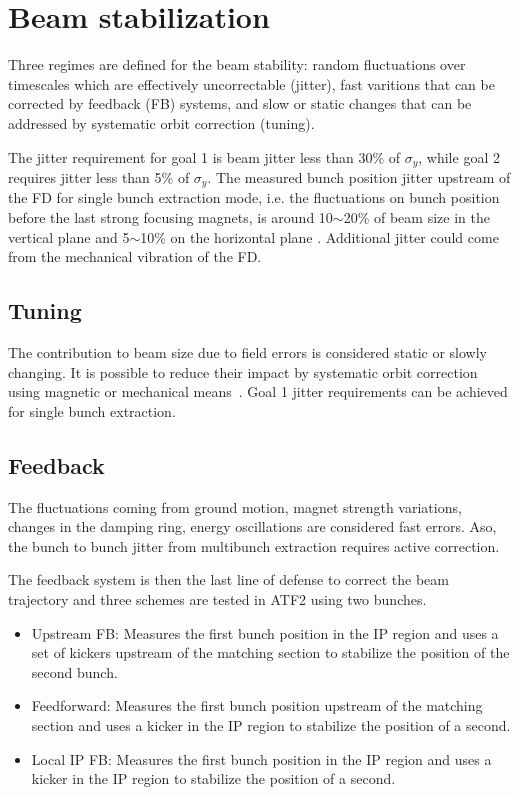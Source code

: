 \section{Beam stabilization}
Three regimes are defined for the beam stability: random fluctuations over timescales which are effectively uncorrectable (jitter), fast varitions that can be corrected by feedback (FB) systems, and slow or static changes that can be addressed by systematic orbit correction (tuning).\par
The jitter requirement for goal 1 is beam jitter less than 30\% of $\sigma_y$, while goal 2 requires jitter less than 5\% of $\sigma_y$. The measured bunch position jitter upstream of the FD for single bunch extraction mode, i.e. the fluctuations on bunch position before the last strong focusing magnets, is around 10$\sim$20\% of beam size in the vertical plane and 5$\sim$10\% on the horizontal plane \cite{PateckiJitter}. Additional jitter could come from the mechanical vibration of the FD.\par
\subsection{Tuning}
The contribution to beam size due to field errors is considered static or slowly changing. It is possible to reduce their impact by systematic orbit correction using magnetic or mechanical means~\cite{ATF2prop}. Goal 1 jitter requirements can be achieved for single bunch extraction.\par
\subsection{Feedback}
The fluctuations coming from ground motion, magnet strength variations, changes in the damping ring, energy oscillations are considered fast errors. Aso, the bunch to bunch jitter from multibunch extraction requires active correction.\par 
The feedback system is then the last line of defense to correct the beam trajectory and three schemes are tested in ATF2 using two bunches.\par
\begin{itemize}
 \item Upstream FB: Measures the first bunch position in the IP region and uses a set of kickers upstream of the matching section to stabilize the position of the second bunch.
 \item Feedforward: Measures the first bunch position upstream of the matching section and uses a kicker in the IP region to stabilize the position of a second.
 \item Local IP FB: Measures the first bunch position in the IP region and uses a kicker in the IP region to stabilize the position of a second.
\end{itemize}


